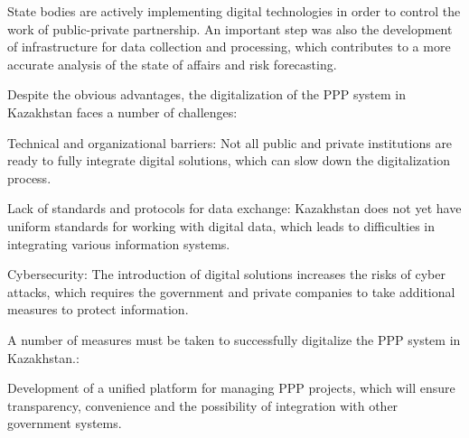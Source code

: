 
State bodies are actively implementing digital technologies in order to
control the work of public-private partnership. An important step was
also the development of infrastructure for data collection and
processing, which contributes to a more accurate analysis of the state
of affairs and risk forecasting.

Despite the obvious advantages, the digitalization of the PPP system in
Kazakhstan faces a number of challenges:

Technical and organizational barriers: Not all public and private
institutions are ready to fully integrate digital solutions, which can
slow down the digitalization process.

Lack of standards and protocols for data exchange: Kazakhstan does not
yet have uniform standards for working with digital data, which leads to
difficulties in integrating various information systems.

Cybersecurity: The introduction of digital solutions increases the risks
of cyber attacks, which requires the government and private companies to
take additional measures to protect information.

A number of measures must be taken to successfully digitalize the PPP
system in Kazakhstan.:

Development of a unified platform for managing PPP projects, which will
ensure transparency, convenience and the possibility of integration with
other government systems.

